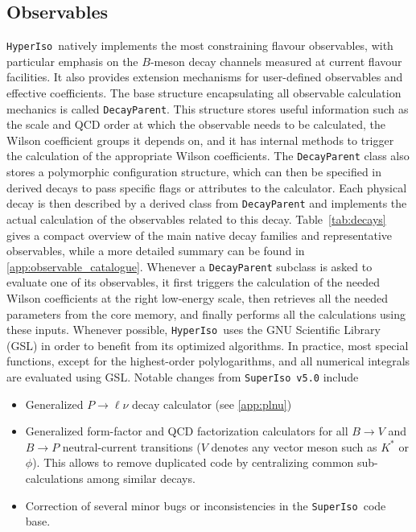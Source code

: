 \documentclass[preprint,11pt]{elsarticle}
\newcommand{\hi}{\texttt{HyperIso}}
\newcommand{\spi}{\texttt{SuperIso}}
\begin{document}
\subsection{Observables}

\hi~natively implements the most constraining flavour  observables, with particular emphasis on the $B$-meson decay channels measured at current flavour facilities. It also provides extension mechanisms for user-defined observables and effective coefficients. \smallbreak
The base structure encapsulating all observable calculation mechanics is called \texttt{DecayParent}. This structure stores useful information such as the scale and QCD order at which the observable needs to be calculated, the Wilson coefficient groups it depends on, and it has internal methods to trigger the calculation of the appropriate Wilson coefficients. The \texttt{DecayParent} class also stores a polymorphic configuration structure, which can then be specified in derived decays to pass specific flags or attributes to the calculator. Each physical decay is then described by a derived class from \texttt{DecayParent} and implements the actual calculation of the observables related to this decay. Table~\ref{tab:decays} gives a compact overview of the main native decay families and representative observables, while a more detailed summary can be found in \ref{app:observable_catalogue}.\smallbreak
Whenever a \texttt{DecayParent} subclass is asked to evaluate one of its observables, it first triggers the calculation of the needed Wilson coefficients at the right low-energy scale, then retrieves all the needed parameters from the core memory, and finally performs all the calculations using these inputs. Whenever possible, \hi~uses the GNU Scientific Library (GSL) \cite{gsl} in order to benefit from its optimized algorithms. In practice, most special functions, except for the highest-order polylogarithms, and all numerical integrals are evaluated using GSL.\smallbreak
Notable changes from \spi~\texttt{v5.0} include
\begin{itemize}
    \item Generalized $P\to\ell\nu$ decay calculator (see \ref{app:plnu})
    \item Generalized form-factor and QCD factorization calculators for all $B\to V$ and $B\to P$ neutral-current transitions ($V$ denotes any vector meson such as $K^*$ or $\phi$). This allows to remove duplicated code by centralizing common sub-calculations among similar decays.
    \item Correction of several minor bugs or inconsistencies in the \spi~code base.
\end{itemize}
\end{document}

